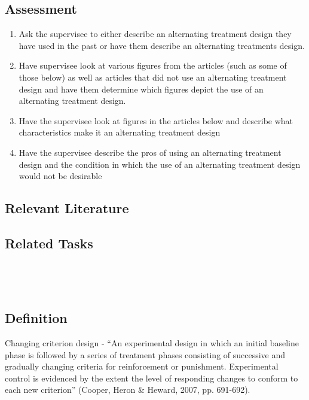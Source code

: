 \subsection{Assessment}
\begin{enumerate}
\item Ask the supervisee to either describe an alternating treatment design they have used in the past or have them describe an alternating treatments design.
\item Have supervisee look at various figures  from the articles (such as some of those below) as well as articles that did not use an alternating treatment design and have them determine which figures depict the use of an alternating treatment design. 
\item Have the supervisee look at figures in the articles below and describe what characteristics make it an alternating treatment design
\item Have the supervisee describe the pros of using an alternating treatment design and the condition in which the use of an alternating treatment design would not be desirable
\end{enumerate}
%
\subsection{Relevant Literature}
\begin{refsection}
\nocite{barbetta1993effects,
    barlow1979alternating,
    cooper2007applied,
    iwata1994toward,
    martens1992effects,
    singh1985comparison,
    ulman1975multielement}
\printbibliography[heading=none]
\end{refsection}
%
\subsection{Related Tasks} 
\fourbThree{}\\ 
\fourjNine{}\\
%
%
%
%
%
%
%
\section{\fourbSix{}}
\subsection{Definition} 
Changing criterion design - ``An experimental design in which an initial baseline phase is followed by a series of treatment phases consisting of successive and gradually changing criteria for reinforcement or punishment. Experimental control is evidenced by the extent the level of responding changes to conform to each new criterion'' (Cooper, Heron \& Heward, 2007, pp. 691-692).

